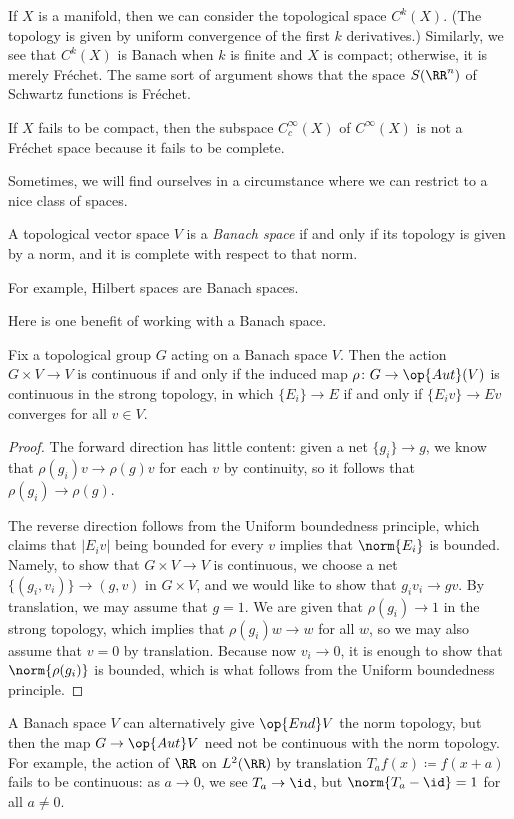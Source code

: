 \documentclass[../notes.tex]{subfiles}
\begin{document}
\begin{example}
	If $X$ is a manifold, then we can consider the topological space $C^k(X)$. (The topology is given by uniform convergence of the first $k$ derivatives.) Similarly, we see that $C^k(X)$ is Banach when $k$ is finite and $X$ is compact; otherwise, it is merely Fr\'echet. The same sort of argument shows that the space $S(\RR^n)$ of Schwartz functions is Fr\'echet.
\end{example}
\begin{nex}
	If $X$ fails to be compact, then the subspace $C_c^\infty(X)$ of $C^\infty(X)$ is not a Fr\'echet space because it fails to be complete.
\end{nex}
Sometimes, we will find ourselves in a circumstance where we can restrict to a nice class of spaces.
\begin{definition}[Banach]
	A topological vector space $V$ is a \textit{Banach space} if and only if its topology is given by a norm, and it is complete with respect to that norm.
\end{definition}
For example, Hilbert spaces are Banach spaces.

Here is one benefit of working with a Banach space.
\begin{lemma}
	Fix a topological group $G$ acting on a Banach space $V$. Then the action $G\times V\to V$ is continuous if and only if the induced map $\rho\colon G\to\op{Aut}(V)$ is continuous in the strong topology, in which $\{E_i\}\to E$ if and only if $\{E_iv\}\to Ev$ converges for all $v\in V$.
\end{lemma}
\begin{proof}
	The forward direction has little content: given a net $\{g_i\}\to g$, we know that $\rho(g_i)v\to\rho(g)v$ for each $v$ by continuity, so it follows that $\rho(g_i)\to\rho(g)$.
	
	The reverse direction follows from the Uniform boundedness principle, which claims that $\left|E_iv\right|$ being bounded for every $v$ implies that $\norm{E_i}$ is bounded. Namely, to show that $G\times V\to V$ is continuous, we choose a net $\{(g_i,v_i)\}\to (g,v)$ in $G\times V$, and we would like to show that $g_iv_i\to gv$. By translation, we may assume that $g=1$. We are given that $\rho(g_i)\to1$ in the strong topology, which implies that $\rho(g_i)w\to w$ for all $w$, so we may also assume that $v=0$ by translation. Because now $v_i\to0$, it is enough to show that $\norm{\rho(g_i)}$ is bounded, which is what follows from the Uniform boundedness principle.
\end{proof}
\begin{remark}
	A Banach space $V$ can alternatively give $\op{End}V$ the norm topology, but then the map $G\to\op{Aut}V$ need not be continuous with the norm topology. For example, the action of $\RR$ on $L^2(\RR)$ by translation $T_af(x)\coloneqq f(x+a)$ fails to be continuous: as $a\to0$, we see $T_a\to\id$, but $\norm{T_a-\id}=1$ for all $a\ne0$.
\end{remark}
\end{document}
